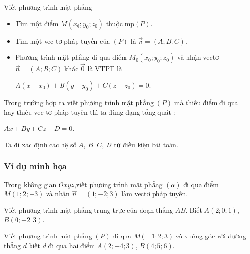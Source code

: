 \begin{dang}{Viết phương trình mặt phẳng}
\begin{itemize}
	\item Tìm  một điểm $M(x_0; y_0; z_0)$ thuộc mp$(P)$.
	\item Tìm một vec-tơ pháp tuyến của $\left(P \right)$ là $\overrightarrow{n}=(A;B;C)$.
	\item Phương trình mặt phẳng đi qua điểm $M_0(x_0;y_0;z_0)$ và nhận vectơ $\overrightarrow{n}=(A;B;C)$ khác $\overrightarrow{0}$ là VTPT là
\begin{center}
	$A(x-x_0)+B(y-y_0)+C(z-z_0)=0$.
\end{center}
	
\end{itemize}
\begin{note}
	Trong trường hợp ta viết phương trình mặt phẳng $(P)$ mà thiếu điểm đi qua hay thiếu vec-tơ pháp tuyến thì ta dùng dạng tổng quát : \begin{center}
		$Ax+By+Cz+D=0$.
	\end{center}
 Ta đi xác định các hệ số $A$, $B$, $C$, $D$ từ điều kiện bài toán.
\end{note}
\end{dang}
\setcounter{subsubsection}{0}
\setcounter{vd}{0}
\setcounter{bt}{0}
\setcounter{ex}{0}
\subsubsection{Ví dụ minh họa}
\begin{vd}%
	Trong không gian $Oxyz$,viết phương trình  mặt phẳng $(\alpha)$ đi qua điểm $M(1;2;-3)$ và nhận $\vec{n}=(1;-2;3)$ làm vectơ pháp tuyến.
\end{vd}

\begin{vd}%
	Viết phương trình mặt phẳng trung trực của đoạn thẳng $AB$.
	Biết  $A(2;0;1)$, $B(0;-2;3)$. 
		
\end{vd}
\begin{vd}%
	Viết phương trình mặt phẳng $(P)$ đi qua $M(-1;2;3)$ và vuông góc với đường thẳng $d$ biết $d$ đi qua hai điểm $A(2;-4;3)$, $B(4;5;6)$.
\end{vd}

